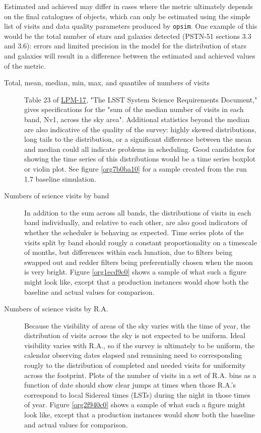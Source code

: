Estimated and achieved may differ in cases where the metric ultimately depends on the final catalogues of objects, which can only be estimated using the simple list of visits and data quality parameters produced by \texttt{opsim}.
One example of this would be the total number of stars and galaxies detected (PSTN-51 sections 3.3 and 3.6): errors and limited precision in the model for the distribution of stars and galaxies will result in a difference between the estimated and achieved values of the metric.

\begin{description}
\item[{Total, mean, median, min, max, and quantiles of numbers of visits}] Table 23 of \href{http://ls.st/lpm-17}{LPM-17}, "The LSST System Science Requirements Document," gives specifications for the "sum of the median number of visits in each band, Nv1, across the sky area". Additional statistics beyond the median are also indicative of the quality of the survey: highly skewed distributions, long tails to the distribution, or a significant difference between the mean and median could all indicate problems in scheduling. Good candidates for showing the time series of this distributions would be a time series boxplot or violin plot. See figure \ref{org7b0ba10} for a sample created from the run 1.7 baseline simulation.
\item[{Numbers of science visits by band}] In addition to the sum across all bands, the distributions of visits in each band individually, and relative to each other, are also good indicators of whether the scheduler is behaving as expected. Time series plots of the visits split by band should rougly a constant proportionality on a timescale of months, but differences within each lunation, due to filters being swapped out and redder filters being preferentially chosen when the moon is very bright. Figure \ref{org1ecd9c0} shows a sample of what such a figure might look like, except that a production instances would show both the baseline and actual values for comparison.
\item[{Numbers of science visits by R.A.}] Because the visibility of areas of the sky varies with the time of year, the distribution of visits across the sky is not expected to be uniform. Ideal visibility varies with R.A., so if the survey is ultimately to be uniform, the calendar observing dates elapsed and remaining need to corresponding rougly to the distribution of completed and needed visits for uniformity across the footprint. Plots of the number of visits in a set of R.A. bins as a function of date should show clear jumps at times when those R.A.'s correspond to local Sidereal times (LSTs) during the night in those times of year. Figure \ref{org2f940c0} shows a sample of what such a figure might look like, except that a production instances would show both the baseline and actual values for comparison.

\end{description}
